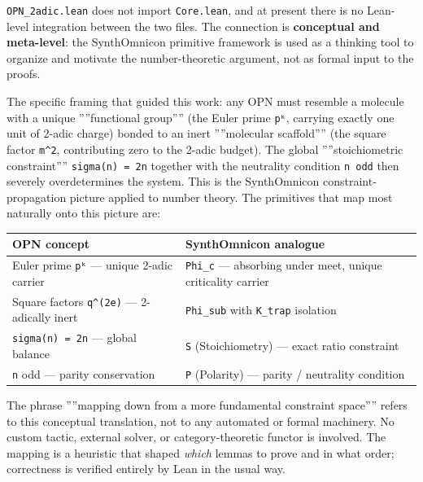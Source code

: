 \documentclass[11pt,a4paper]{article}
\begin{document}
\texttt{OPN\_2adic.lean} does not import \texttt{Core.lean}, and at present there is no Lean-level integration
between the two files. The connection is \textbf{conceptual and meta-level}: the SynthOmnicon
primitive framework is used as a thinking tool to organize and motivate the number-theoretic
argument, not as formal input to the proofs.

The specific framing that guided this work: any OPN must resemble a molecule with a unique
''''functional group'''' (the Euler prime \texttt{pᵏ}, carrying exactly one unit of 2-adic charge) bonded to
an inert ''''molecular scaffold'''' (the square factor \texttt{m\^{}2}, contributing zero to the 2-adic budget).
The global ''''stoichiometric constraint'''' \texttt{sigma(n) = 2n} together with the neutrality condition \texttt{n odd}
then severely overdetermines the system. This is the SynthOmnicon constraint-propagation picture
applied to number theory. The primitives that map most naturally onto this picture are:

\begin{table}[htbp]
\centering
\small
{}
\begin{tabularx}{\textwidth}{>{\centering\arraybackslash}X >{\centering\arraybackslash}X}
\toprule
\rowcolor{gray!25}\textbf{OPN concept} & \textbf{SynthOmnicon analogue} \\
\midrule
\rowcolors{1}{white}{gray!10}
Euler prime \texttt{pᵏ} --- unique 2-adic carrier & \texttt{Phi\_c} --- absorbing under meet, unique criticality carrier \\
Square factors \texttt{q\^{}(2e)} --- 2-adically inert & \texttt{Phi\_sub} with \texttt{K\_trap} isolation \\
\texttt{sigma(n) = 2n} --- global balance & \texttt{S} (Stoichiometry) --- exact ratio constraint \\
\texttt{n} odd --- parity conservation & \texttt{P} (Polarity) --- parity / neutrality condition \\
\bottomrule
\end{tabularx}
\end{table}

The phrase ''''mapping down from a more fundamental constraint space'''' refers to this conceptual
translation, not to any automated or formal machinery. No custom tactic, external solver, or
category-theoretic functor is involved. The mapping is a heuristic that shaped \emph{which} lemmas
to prove and in what order; correctness is verified entirely by Lean in the usual way.
\end{document}
